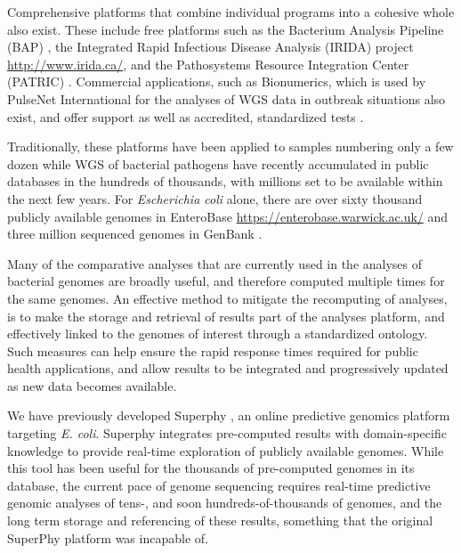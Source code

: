 \documentclass{article}
\begin{document}
Comprehensive platforms that combine individual programs into a cohesive whole also exist. These include free platforms such as the Bacterium Analysis Pipeline (BAP) \cite{thomsen2016bacterial}, the Integrated Rapid Infectious Disease Analysis (IRIDA) project \url{http://www.irida.ca/}, and the Pathosystems Resource Integration Center (PATRIC) \cite{wattam2013patric}. Commercial applications, such as Bionumerics, which is used by PulseNet International for the analyses of WGS data in outbreak situations also exist, and offer support as well as accredited, standardized tests \cite{swaminathan2001pulsenet}.

Traditionally, these platforms have been applied to samples numbering only a few dozen \cite{} while WGS of bacterial pathogens have recently accumulated in public databases in the hundreds of thousands, with millions set to be available within the next few years. For \textit{Escherichia coli} alone, there are over sixty thousand publicly available genomes in EnteroBase \url{https://enterobase.warwick.ac.uk/} and three million sequenced genomes in GenBank \cite{doi:10.1093/nar/gks1195}.

Many of the comparative analyses that are currently used in the analyses of bacterial genomes are broadly useful, and therefore computed multiple times for the same genomes. An effective method to mitigate the recomputing of analyses, is to make the storage and retrieval of results part of the analyses platform, and effectively linked to the genomes of interest through a standardized ontology. Such measures can help ensure the rapid response times required for public health applications, and allow results to be integrated and progressively updated as new data becomes available.

We have previously developed Superphy \cite{whiteside2016superphy}, an online predictive genomics platform targeting \textit{E. coli}. Superphy integrates pre-computed results with domain-specific knowledge to provide real-time exploration of publicly available genomes. While this tool has been useful for the thousands of pre-computed genomes in its database, the current pace of genome sequencing requires real-time predictive genomic analyses of tens-, and soon hundreds-of-thousands of genomes, and the long term storage and referencing of these results, something that the original SuperPhy platform was incapable of.
\end{document}
